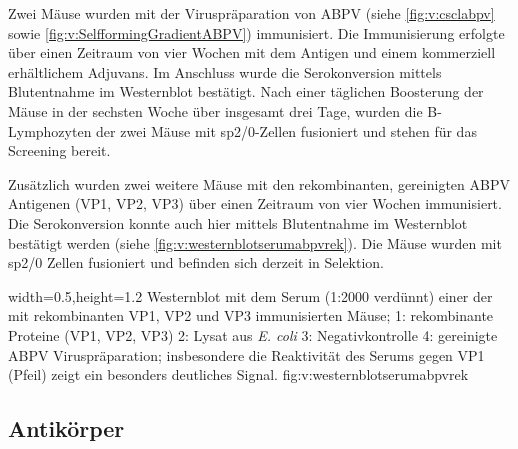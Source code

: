 Zwei Mäuse wurden mit der Viruspräparation von ABPV (siehe \cref{fig:v:csclabpv} sowie \cref{fig:v:SelfformingGradientABPV}) immunisiert. Die Immunisierung erfolgte über einen Zeitraum von vier Wochen mit dem Antigen und einem kommerziell erhältlichem Adjuvans. Im Anschluss wurde die Serokonversion mittels Blutentnahme im Westernblot bestätigt. Nach einer täglichen Boosterung der Mäuse in der sechsten Woche über insgesamt drei Tage, wurden die B-Lymphozyten der zwei Mäuse mit sp2/0-Zellen fusioniert und stehen für das Screening bereit.

Zusätzlich wurden zwei weitere Mäuse mit den rekombinanten, gereinigten ABPV Antigenen (VP1, VP2, VP3) über einen Zeitraum von vier Wochen immunisiert. Die Serokonversion konnte auch hier mittels Blutentnahme im Westernblot bestätigt werden (siehe  \cref{fig:v:westernblotserumabpvrek}). Die Mäuse wurden mit sp2/0 Zellen fusioniert und befinden sich derzeit in Selektion.

{width=0.5\textwidth,height=1.2\textheight}
{Westernblot mit dem Serum (1:2000 verdünnt) einer der mit rekombinanten VP1, VP2 und VP3 immunisierten Mäuse; 1: rekombinante Proteine (VP1, VP2, VP3) 2: Lysat aus \textit{E. coli} 3: Negativkontrolle 4: gereinigte ABPV Viruspräparation; insbesondere die Reaktivität des Serums gegen VP1 (Pfeil) zeigt ein besonders deutliches Signal.}%
{}%
{fig:v:westernblotserumabpvrek}%




\subsection{Antikörper}
